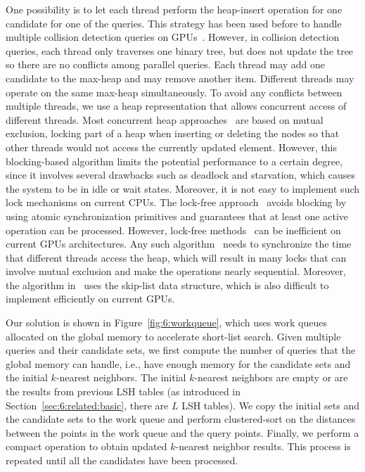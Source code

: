 One possibility is to let each thread perform the heap-insert operation for one candidate for one of the queries. This strategy has been used before to handle multiple collision detection queries on GPUs~\cite{Lauterbach10}. However, in collision detection queries, each thread only traverses one binary tree, but does not update the tree so there are no conflicts among parallel queries. Each thread may add one candidate to the max-heap and may remove another item. Different threads may operate on the same max-heap simultaneously. To avoid any conflicts between multiple threads, we use a heap representation that allows concurrent access of different threads. Most concurrent heap approaches~\cite{Rao:1988:CAP} are based on mutual exclusion, locking part of a heap when inserting or deleting the nodes so that other threads would not access the currently updated element. However, this blocking-based algorithm limits the potential performance to a certain degree, since it involves several drawbacks such as deadlock and starvation, which causes the system to be in idle or wait states. Moreover, it is not easy to implement such lock mechanisms on current CPUs. The lock-free approach~\cite{Sundell:2005:FLC} avoids blocking by using atomic synchronization primitives and guarantees that at least one active operation can be processed. However, lock-free methods~\cite{Sundell:2005:FLC} can be inefficient on current GPUs architectures. Any such algorithm~\cite{Sundell:2005:FLC} needs to synchronize the time that different threads access the heap, which will result in many locks that can involve mutual exclusion and make the operations nearly sequential. Moreover, the algorithm in~\cite{Sundell:2005:FLC} uses the skip-list data structure, which is also difficult to implement efficiently on current GPUs.

Our solution is shown in Figure~\ref{fig:6:workqueue}, which uses work queues allocated on the global memory to accelerate short-list search. Given multiple queries and their candidate sets, we first compute the number of queries that the global memory can handle, i.e., have enough memory for the candidate sets and the initial $k$-nearest neighbors. The initial $k$-nearest neighbors are empty or are the results from previous LSH tables (as introduced in Section~\ref{sec:6:related:basic}, there are $L$ LSH tables). We copy the initial sets and the candidate sets to the work queue and perform clustered-sort on the distances between the points in the work queue and the query points. Finally, we perform a compact operation to obtain updated $k$-nearest neighbor results. This process is repeated until all the candidates have been processed.


